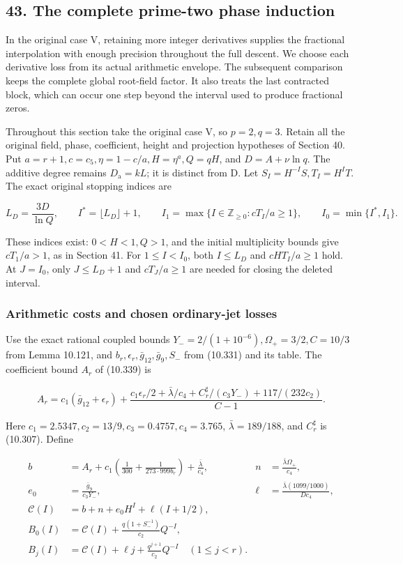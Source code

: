 \documentclass[
  11pt,
  a4paper,
]{article}
\begin{document}
\subsection{43. The complete prime-two phase
induction}\label{the-complete-prime-two-phase-induction}

In the original case V, retaining more integer derivatives supplies the
fractional interpolation with enough precision throughout the full
descent. We choose each derivative loss from its actual arithmetic
envelope. The subsequent comparison keeps the complete global root-field
factor. It also treats the last contracted block, which can occur one
step beyond the interval used to produce fractional zeros.

Throughout this section take the original case V, so \(p=2,q=3\). Retain
all the original field, phase, coefficient, height and projection
hypotheses of Section 40. Put \(a=r+1,c=c_5,\eta=1-c/a,H=\eta^a,Q=qH\),
and \(D=A+\nu\ln q\). The additive degree remains \(D_{\mathrm a}=kL\);
it is distinct from D. Let \(S_I=H^{-I}S,T_I=H^IT\). The exact original
stopping indices are

\[
L_D=\frac{3D}{\ln Q},\qquad
I^*=\lfloor L_D\rfloor+1,\qquad
I_1=\max\{I\in\mathbb Z_{\ge0}:cT_I/a\ge1\},\qquad
I_0=\min\{I^*,I_1\}.
\tag{10.360}
\]

These indices exist: \(0<H<1,Q>1\), and the initial multiplicity bounds
give \(cT_1/a>1\), as in Section 41. For \(1\le I<I_0\), both
\(I\le L_D\) and \(cHT_I/a\ge1\) hold. At \(J=I_0\), only \(J\le L_D+1\)
and \(cT_J/a\ge1\) are needed for closing the deleted interval.

\subsubsection{Arithmetic costs and chosen ordinary-jet
losses}\label{arithmetic-costs-and-chosen-ordinary-jet-losses}

Use the exact rational coupled bounds
\(Y_-=2/(1+10^{-6}),\Omega_+=3/2,C=10/3\) from Lemma 10.121, and
\(b_r,\epsilon_r,\bar g_{12},\bar g_9,S_-\) from (10.331) and its table.
The coefficient bound \(A_r\) of (10.339) is

\[
A_r=c_1(\bar g_{12}+\epsilon_r)+
\frac{c_1\epsilon_r/2+\bar\lambda/c_4+
C_r^{\sharp}/(c_3Y_-)+117/(232c_2)}{C-1}.
\tag{10.361}
\]

Here \(c_1=2.5347,c_2=13/9,c_3=0.4757,c_4=3.765\),
\(\bar\lambda=189/188\), and \(C_r^{\sharp}\) is (10.307). Define

\[
\begin{aligned}
b&=A_r+c_1\left(\frac1{300}+\frac1{273\cdot999b_r}\right)+\frac{\bar\lambda}{c_4},&
n&=\frac{\bar\lambda\Omega_+}{c_4},\\
e_0&=\frac{\bar g_9}{c_3Y_-},&
\ell&=\frac{\bar\lambda(1099/1000)}{Dc_4},\\
\mathcal C(I)&=b+n+e_0H^I+\ell(I+1/2),\\
B_0(I)&=\mathcal C(I)+\frac{q(1+S_-^{-1})}{c_2}Q^{-I},\\
B_j(I)&=\mathcal C(I)+\ell j+\frac{q^{j+1}}{c_2}Q^{-I}\quad(1\le j<r).
\end{aligned}
\tag{10.362}
\]
\end{document}
